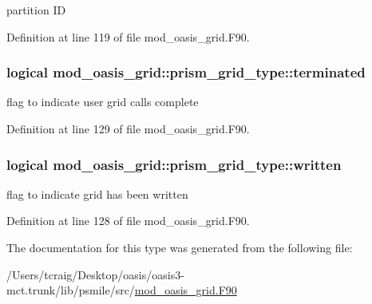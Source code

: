 partition I\+D 



Definition at line 119 of file mod\+\_\+oasis\+\_\+grid.\+F90.

\hypertarget{structmod__oasis__grid_1_1prism__grid__type_a2dcbbc51a20f881a1d06609688d72734}{
\subsubsection[{terminated}]{\setlength{\rightskip}{0pt plus 5cm}logical mod\+\_\+oasis\+\_\+grid\+::prism\+\_\+grid\+\_\+type\+::terminated\hspace{0.3cm}{\ttfamily [private]}}}\label{structmod__oasis__grid_1_1prism__grid__type_a2dcbbc51a20f881a1d06609688d72734}


flag to indicate user grid calls complete 



Definition at line 129 of file mod\+\_\+oasis\+\_\+grid.\+F90.

\hypertarget{structmod__oasis__grid_1_1prism__grid__type_a48d243ede1b306ac35bb9bbeff48785a}{
\subsubsection[{written}]{\setlength{\rightskip}{0pt plus 5cm}logical mod\+\_\+oasis\+\_\+grid\+::prism\+\_\+grid\+\_\+type\+::written\hspace{0.3cm}{\ttfamily [private]}}}\label{structmod__oasis__grid_1_1prism__grid__type_a48d243ede1b306ac35bb9bbeff48785a}


flag to indicate grid has been written 



Definition at line 128 of file mod\+\_\+oasis\+\_\+grid.\+F90.



The documentation for this type was generated from the following file\+:\begin{DoxyCompactItemize}
\item 
/\+Users/tcraig/\+Desktop/oasis/oasis3-\/mct.\+trunk/lib/psmile/src/\hyperlink{mod__oasis__grid_8_f90}{mod\+\_\+oasis\+\_\+grid.\+F90}\end{DoxyCompactItemize}
